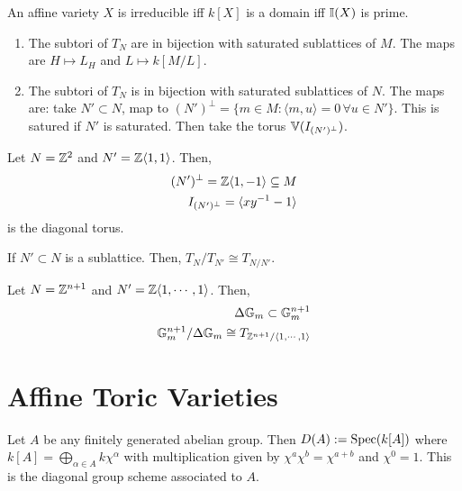 \documentclass[12pt]{amsart}
\begin{document}
\begin{lemma}
    An affine variety $X$ is irreducible iff $k[X]$ is a domain iff $\mathbb I(X)$ is prime. 
\end{lemma}
\begin{corollary}
    \begin{enumerate}
        \item The subtori of $T_N$ are in bijection with saturated sublattices of $M$. The maps are $H \mapsto L_H$ and $L \mapsto k[M/L]$. 
        \item The subtori of $T_N$ is in bijection with saturated sublattices of $N$. 
        The maps are: take $N' \subset N$, map to $(N')^\perp = \{m \in M : \langle m, u\rangle = 0 \, \forall u \in N'\}$. This is satured if $N'$ is saturated. Then take the torus $\mathbb V(I_{(N')^\perp})$.  
    \end{enumerate}
\end{corollary}

\begin{example}
    Let $N = \mathbb Z^2$ and $N' = \mathbb Z\langle 1, 1\rangle$. Then, 
    \begin{align*}
        (N')^\perp = \mathbb Z\langle 1, -1\rangle \subseteq M \\
        I_{(N')^\perp} = \langle xy^{-1} -1\rangle 
    \end{align*}
    is the diagonal torus.
\end{example}

\begin{lemma}
    If $N' \subset N$ is a sublattice. Then, $T_N/T_{N'} \cong T_{N/N'}$. 
\end{lemma}

\begin{example}
    Let $N = \mathbb Z^{n+1}$ and $N' = \mathbb Z\langle 1, \cdots, 1\rangle$. Then, 
    \begin{align*}
        \Delta\mathbb G_m \subset \mathbb G_m^{n+1} \\
        \mathbb G_m^{n+1}/\Delta \mathbb G_m \cong T_{\mathbb Z^{n+1}/\langle 1, \cdots, 1\rangle}
    \end{align*}
\end{example}


\section{Affine Toric Varieties}
\begin{definition}
    Let $A$ be any finitely generated abelian group. Then $D(A) := \operatorname{Spec}(k[A])$ where $k[A] =\bigoplus_{\alpha \in A} k\chi^\alpha$ with multiplication given by $\chi^a\chi^{b}= \chi^{a+b}$ and $\chi^0 = 1$. This is the diagonal group scheme associated to $A$. 
\end{definition}
\end{document}

